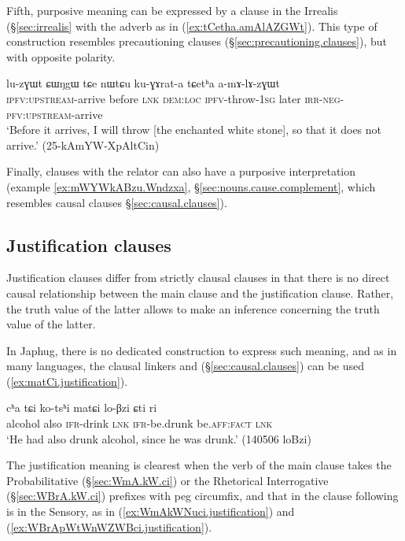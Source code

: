  Fifth, purposive meaning can be expressed by a clause in the Irrealis (§\ref{sec:irrealis} with the adverb  as in (\ref{ex:tCetha.amAlAZGWt}). This type of construction resembles precautioning clauses (§\ref{sec:precautioning.clauses}), but with opposite polarity.

 \begin{exe}
\ex \label{ex:tCetha.amAlAZGWt}
\gll lu-zɣɯt ɕɯŋgɯ tɕe nɯtɕu ku-ɣɤrat-a tɕetʰa a-mɤ-lɤ-zɣɯt \\
\textsc{ipfv}:\textsc{upstream}-arrive before \textsc{lnk} \textsc{dem}:\textsc{loc} \textsc{ipfv}-throw-\textsc{1sg} later \textsc{irr}-\textsc{neg}-\textsc{pfv}:\textsc{upstream}-arrive \\
\glt `Before it arrives, I will throw [the enchanted white stone], so that it does not arrive.' (25-kAmYW-XpAltCin)
\end{exe}

Finally, clauses with the relator  can also have a purposive interpretation (example \ref{ex:mWYWkABzu.Wndzxa}, §\ref{sec:nouns.cause.complement}, which resembles causal clauses §\ref{sec:causal.clauses}).

\subsection{Justification clauses} \label{sec:justification.clauses} 
Justification clauses \citep{lopes09justification} differ from strictly clausal clauses in that there is no direct causal  relationship between the main clause and the justification clause. Rather, the truth value of the latter allows to make an inference concerning the truth value of the latter. 

In Japhug, there is no dedicated construction to express such meaning, and as in many languages, the clausal linkers  and  (§\ref{sec:causal.clauses}) can be used (\ref{ex:matCi.justification}). 

\begin{exe}
\ex \label{ex:matCi.justification}
\gll cʰa tɕi ko-tsʰi matɕi lo-βzi ɕti ri \\
alcohol also \textsc{ifr}-drink \textsc{lnk} \textsc{ifr}-be.drunk be.\textsc{aff}:\textsc{fact} \textsc{lnk} \\
\glt `He had also drunk alcohol, since he was drunk.' (140506 loBzi)
 \end{exe}

The justification meaning is clearest when the verb of the main clause takes the Probabilitative  (§\ref{sec:WmA.kW.ci}) or the Rhetorical Interrogative  (§\ref{sec:WBrA.kW.ci}) prefixes with peg circumfix, and that in the clause following  is in the Sensory, as in (\ref{ex:WmAkWNuci.justification}) and (\ref{ex:WBrApWtWnWZWBci.justification}).
 
